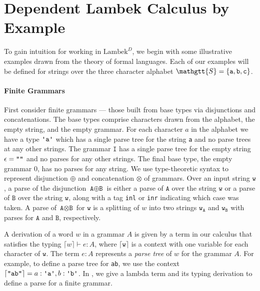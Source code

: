 \documentclass[acmsmall,nonacm]{acmart}
\renewcommand{\Sigma}{\mathgtt{S}}
\newcommand{\theoryname}{Dependent Lambek Calculus\xspace}
\newcommand{\theoryabbv}{$\textrm{Lambek}^D$\xspace}
\newcommand{\literal}[1]{\texttt{\textquotesingle#1\textquotesingle}}
\newcommand{\stringquote}[1]{\texttt{\textquotedbl#1\textquotedbl}}
\newcommand{\internalize}[1]{\lceil#1\rceil}
\begin{document}
\section{\theoryname by Example}
\label{sec:type-theory-examples}
To gain intuition for working in \theoryabbv, we begin with some
illustrative examples drawn from the theory of formal languages. Each
of our examples will be defined for strings over the three character
alphabet $\Sigma = \{ \texttt{a} , \texttt{b}, \texttt{c} \}$.

\newcommand{\A}{\texttt{A}}
\newcommand{\B}{\texttt{B}}
\newcommand{\I}{\texttt{I}}
\newcommand{\f}{\texttt{f}}
\newcommand{\g}{\texttt{g}}
\renewcommand{\L}{\texttt{L}}
\renewcommand{\a}{\texttt{a}}
\renewcommand{\b}{\texttt{b}}
\renewcommand{\c}{\texttt{c}}
\newcommand{\w}{\texttt{w}}

\paragraph{Finite Grammars}
First consider finite grammars --- those built from base types via disjunctions and
concatenations. The base types comprise characters drawn from the alphabet, the
empty string, and the empty grammar.
For each character $a$ in the alphabet we have a type $\literal a$ which
has a single parse tree for the string
\stringquote{a} and no parse trees at any other strings. The grammar $\I$ has a single
parse tree for the empty string $\epsilon = \stringquote{}$ and no parses for any other strings.
The final base type, the empty grammar $0$, has no parses for any string. We
use type-theoretic syntax to represent disjunction $\oplus$ and concatenation
$\otimes$ of
grammars. Over an input string $\w$, a parse of the disjunction $\A \oplus \B$ is either
a parse of $\A$ over the string $\w$ or a
parse of $\B$ over the string $\w$, along with a tag \texttt{inl} or \texttt{inr} indicating which case was taken. A parse of $\A \otimes \B$ for
$\w$ is a splitting of $w$ into two strings $\w_{\A}$ and $\w_{\B}$ with
parses for $\A$
and $\B$, respectively.

A derivation of a word $w$ in a grammar $A$ is given by a term in our calculus that satisfies the typing
$\internalize{w} \vdash e : A$,
where $\internalize \w$ is a context with one variable for each character of
$\w$. The term $e : A$ represents a \emph{parse tree} of $w$ for the grammar $A$. For
example, to define a parse tree for \stringquote{ab}, we use
the context $\internalize{\stringquote{ab}} = a : \literal a , b :
\literal b$. In , we give a lambda term and its
typing derivation to define a parse for a finite grammar.
\end{document}
